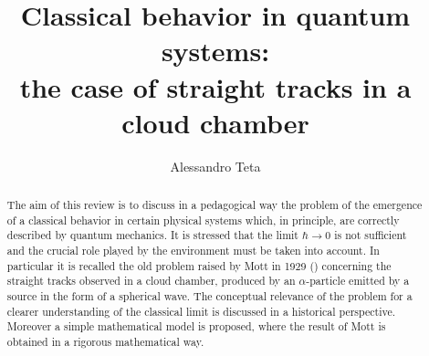 \documentclass[12pt,reqno]{amsart}
\newcommand{\n}{\relax}
\newcommand{\vs}{\vspace{0.5cm}}
\numberwithin{equation}{section}
\begin{document}
\title[ ]{Classical behavior in quantum systems: \\ \vspace{0.1cm} the case of straight tracks in a cloud chamber\\
 \vspace*{0.6cm}}







\author{Alessandro Teta} \address{ A. Teta: Dipartimento di Matematica Pura ed
Applicata,  Universit\`a di L'Aquila}



{\maketitle}

\vs




\begin{abstract}
The aim of this review is to discuss in a pedagogical way the problem of the emergence  of a classical behavior  in certain physical systems which, in principle, are correctly described by quantum mechanics. It is stressed that the  limit  $\hbar \rightarrow 0$ is not sufficient and the crucial role played by the environment must be taken into account. 
In particular it is recalled the old problem raised by Mott in 1929 (\cite{m}) concerning  the straight tracks observed in a cloud chamber, produced by an $\alpha$-particle emitted by a source in the form of a spherical wave. The conceptual  relevance of the problem for a clearer understanding   of the classical limit is discussed in a historical  perspective. Moreover  a simple mathematical model is proposed, where the result of Mott is obtained in a rigorous mathematical way.

 
\end{abstract}
\end{document}
